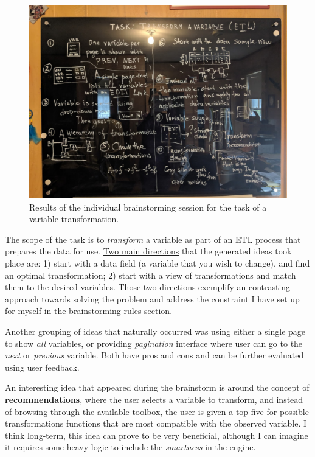 \documentclass[12pt,letterpaper]{article}
\begin{document}
\begin{figure}[h]
\centering
\includegraphics[scale=.3]{figures/m3/brainstorm.jpg}
\caption{Results of the individual brainstorming session for the task of a variable transformation.}
\label{fig::1}
\end{figure}

The scope of the task is to \textit{transform} a variable as part of an ETL process that prepares the data for use. \underline{Two main directions} that the generated ideas took place are: 1) start with a data field (a variable that you wish to change), and find an optimal transformation; 2) start with a view of transformations and match them to the desired variables. Those two directions exemplify an contrasting approach towards solving the problem and address the constraint I have set up for myself in the brainstorming rules section.  

Another grouping of ideas that naturally occurred was using either a single page to show \textit{all} variables, or providing \textit{pagination} interface where user can go to the \textit{next} or \textit{previous} variable. Both have pros and cons and can be further evaluated using user feedback. 

An interesting idea that appeared during the brainstorm is around the concept of \textbf{recommendations}, where the user selects a variable to transform, and instead of browsing through the available toolbox, the user is given a top five for possible transformations functions that are most compatible with the observed variable. I think long-term, this idea can prove to be very beneficial, although I can imagine it requires some heavy logic to include the \textit{smartness} in the engine.   
\end{document}
